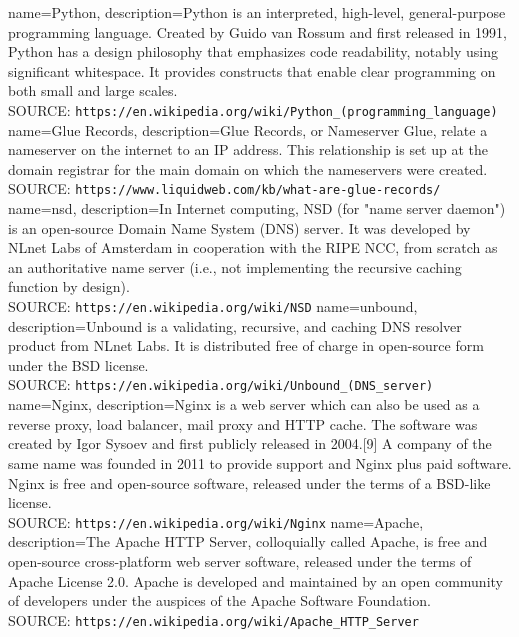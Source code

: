 {
	name=Python,
	description={Python is an interpreted, high-level, general-purpose programming language. Created by Guido van Rossum and first released in 1991, Python has a design philosophy that emphasizes code readability, notably using significant whitespace. It provides constructs that enable clear programming on both small and large scales.\\SOURCE: \texttt{https://en.wikipedia.org/wiki/Python\_(programming\_language)}}
}
{
	name=Glue Records,
	description={Glue Records, or Nameserver Glue, relate a nameserver on the internet to an IP address. This relationship is set up at the domain registrar for the main domain on which the nameservers were created.\\SOURCE: \texttt{https://www.liquidweb.com/kb/what-are-glue-records/}}
}
{
	name=nsd,
	description={In Internet computing, NSD (for "name server daemon") is an open-source Domain Name System (DNS) server. It was developed by NLnet Labs of Amsterdam in cooperation with the RIPE NCC, from scratch as an authoritative name server (i.e., not implementing the recursive caching function by design).  \\SOURCE: \texttt{https://en.wikipedia.org/wiki/NSD}}
}
{
	name=unbound,
	description={Unbound is a validating, recursive, and caching DNS resolver product from NLnet Labs. It is distributed free of charge in open-source form under the BSD license. \\SOURCE: \texttt{https://en.wikipedia.org/wiki/Unbound\_(DNS\_server)}}
}
{
	name=Nginx,
	description={Nginx  is a web server which can also be used as a reverse proxy, load balancer, mail proxy and HTTP cache. The software was created by Igor Sysoev and first publicly released in 2004.[9] A company of the same name was founded in 2011 to provide support and Nginx plus paid software. Nginx is free and open-source software, released under the terms of a BSD-like license. \\SOURCE: \texttt{https://en.wikipedia.org/wiki/Nginx}}
}
{
	name=Apache,
	description={The Apache HTTP Server, colloquially called Apache, is free and open-source cross-platform web server software, released under the terms of Apache License 2.0. Apache is developed and maintained by an open community of developers under the auspices of the Apache Software Foundation.  \\SOURCE: \texttt{https://en.wikipedia.org/wiki/Apache\_HTTP\_Server}}
}
